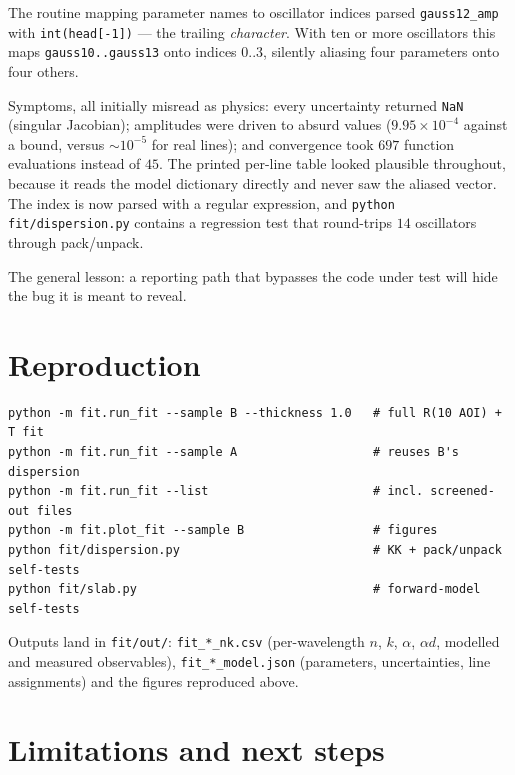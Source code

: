 \documentclass[11pt,a4paper]{article}
\newcommand{\ad}{\alpha d}
\begin{document}
The routine mapping parameter names to oscillator indices parsed
\texttt{gauss12\_amp} with \texttt{int(head[-1])} --- the trailing
\emph{character}. With ten or more oscillators this maps
\texttt{gauss10..gauss13} onto indices $0..3$, silently aliasing four parameters
onto four others.

Symptoms, all initially misread as physics: every uncertainty returned
\texttt{NaN} (singular Jacobian); amplitudes were driven to absurd values
($9.95\times10^{-4}$ against a bound, versus $\sim10^{-5}$ for real lines); and
convergence took $697$ function evaluations instead of $45$. The printed
per-line table looked plausible throughout, because it reads the model
dictionary directly and never saw the aliased vector. The index is now parsed
with a regular expression, and
\texttt{python fit/dispersion.py} contains a regression test that round-trips
$14$ oscillators through pack/unpack.

The general lesson: a reporting path that bypasses the code under test will hide
the bug it is meant to reveal.

\section{Reproduction}

\begin{verbatim}
python -m fit.run_fit --sample B --thickness 1.0   # full R(10 AOI) + T fit
python -m fit.run_fit --sample A                   # reuses B's dispersion
python -m fit.run_fit --list                       # incl. screened-out files
python -m fit.plot_fit --sample B                  # figures
python fit/dispersion.py                           # KK + pack/unpack self-tests
python fit/slab.py                                 # forward-model self-tests
\end{verbatim}

Outputs land in \texttt{fit/out/}: \texttt{fit\_*\_nk.csv} (per-wavelength
$n$, $k$, $\alpha$, $\ad$, modelled and measured observables),
\texttt{fit\_*\_model.json} (parameters, uncertainties, line assignments) and
the figures reproduced above.

\section{Limitations and next steps}
\label{sec:limits}
\end{document}
